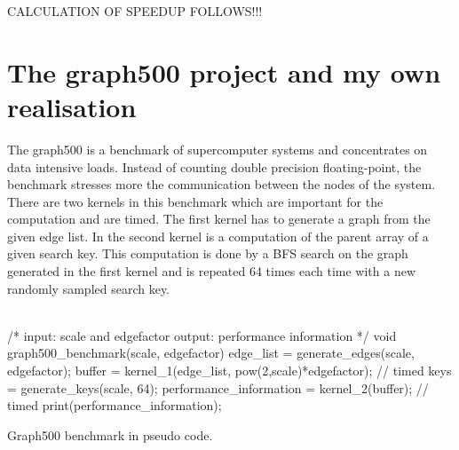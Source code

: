 \documentclass[12pt,a4paper]{article}
\begin{document}
CALCULATION OF SPEEDUP FOLLOWS!!!

\section{The graph500 project and my own realisation}
\label{sec:graph500}

The graph500 \cite{graph500} is a benchmark of supercomputer systems and concentrates on data intensive loads. Instead of counting double precision floating-point, the benchmark stresses more the communication between the nodes of the system. There are two kernels in this benchmark which are important for the computation and are timed. The first kernel has to generate a graph from the given edge list. In the second kernel is a computation of the parent array of a given search key. This computation is done by a BFS search on the graph generated in the first kernel and is repeated 64 times each time with a new randomly sampled search key.\\
\\
\begin{listing}[H]
\begin{ccode}
/*
input: scale and edgefactor
output: performance information
*/
void graph500_benchmark(scale, edgefactor){
	edge_list = generate_edges(scale, edgefactor);
	buffer = kernel_1(edge_list, pow(2,scale)*edgefactor); // timed
	keys = generate_keys(scale, 64);
	performance_information = kernel_2(buffer); // timed
	print(performance_information);
}
\end{ccode}
\caption{Graph500 benchmark in pseudo code.}
\label{lst:graph500}
\end{listing}
\end{document}
